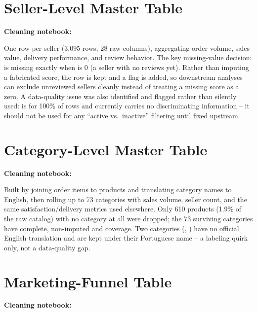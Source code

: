 \documentclass[11pt,a4paper]{report}
\begin{document}
\section{Seller-Level Master Table}
\textbf{Cleaning notebook:} 

One row per seller (3{,}095 rows, 28 raw columns), aggregating order volume, sales value, delivery
performance, and review behavior. The key missing-value decision:  is
missing exactly when  is 0 (a seller with no reviews yet). Rather than
imputing a fabricated score, the row is kept and a  flag is added, so
downstream analyses can exclude unreviewed sellers cleanly instead of treating a missing score as
a zero. A data-quality issue was also identified and flagged rather than silently used:
 is  for 100\% of rows and currently carries no
discriminating information -- it should not be used for any ``active vs.\ inactive'' filtering
until fixed upstream.

\section{Category-Level Master Table}
\textbf{Cleaning notebook:} 

Built by joining order items to products and translating category names to English, then rolling
up to 73 categories with sales volume, seller count, and the same satisfaction/delivery metrics
used elsewhere. Only 610 products (1.9\% of the raw catalog) with no category at all were dropped;
the 73 surviving categories have complete, non-imputed  and
 coverage. Two categories (,
) have no official English translation
and are kept under their Portuguese name -- a labeling quirk only, not a data-quality gap.

\section{Marketing-Funnel Table}
\textbf{Cleaning notebook:} 
\end{document}
